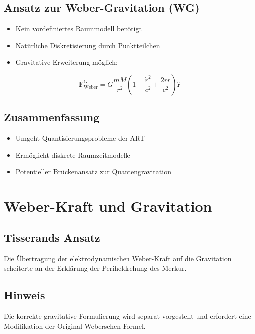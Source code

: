\subsection{Ansatz zur Weber-Gravitation (WG)}
\begin{itemize}[leftmargin=*,noitemsep]
    \item Kein vordefiniertes Raummodell benötigt
    \item Natürliche Diskretisierung durch Punktteilchen
    \item Gravitative Erweiterung möglich:
\end{itemize}

\begin{equation}
\bm{F}_{\text{Weber}}^{G} = G\frac{mM}{r^2}\left(1 - \frac{\dot{r}^2}{c^2} + \frac{2r\ddot{r}}{c^2}\right)\bm{\hat{r}}
\end{equation}

\subsection*{Zusammenfassung}
\begin{itemize}[leftmargin=*,noitemsep]
    \item Umgeht Quantisierungsprobleme der ART
    \item Ermöglicht diskrete Raumzeitmodelle
    \item Potentieller Brückenansatz zur Quantengravitation
\end{itemize}

\section{Weber-Kraft und Gravitation}
\subsection*{Tisserands Ansatz}
Die Übertragung der elektrodynamischen Weber-Kraft \cite{tisserand1894} auf die Gravitation scheiterte an der Erklärung der Periheldrehung des Merkur.

\subsection*{Hinweis}
Die korrekte gravitative Formulierung wird separat vorgestellt und erfordert eine Modifikation der Original-Weberschen Formel.
